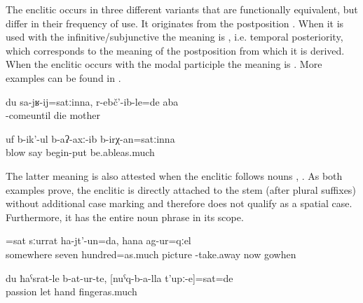 The enclitic  occurs in three different variants that are functionally equivalent, but differ in their frequency of use. It originates from the postposition  . When it is used with the infinitive/subjunctive the meaning is  , i.e. temporal posteriority, which corresponds to the meaning of the postposition from which it is derived. When the enclitic occurs with the modal participle the meaning is  . More examples can be found in .

\begin{exe}
	\ex	\label{ex:‎Until I came my mother died1}
	\gll	du	sa-jʁ-ij=satːinna,	r-ebč'-ib-le=de	aba\\
			-comeuntil	die	mother\\
	\glt	{}
	
		\ex	\label{ex:(The wind) began to blow as strong as it could}
	\gll	uf	b-ik'-ul	b-aʔ-axː-ib	b-irχ-an=satːinna\\
		blow	say	begin-put	be.ableas.much\\
	\glt	{}
\end{exe}


The latter meaning is also attested when the enclitic follows nouns , . As both examples prove, the enclitic is directly attached to the stem (after plural suffixes) without additional case marking and therefore does not qualify as a spatial case. Furthermore, it has the entire noun phrase in its scope.
%
\begin{exe}
	\ex	\label{ex:‎‎‎Around as much as 700 pictures I made when we went (there) now}
	=sat	sːurrat	ha-jt'-un=da,	hana	ag-ur=qːel\\
		somewhere	seven	hundred=as.much	picture	-take.away	now	gowhen\\
	\glt	{}

	\ex	\label{ex:‎‎‎The ones that I left in passion (i.e. that fell in love with me)}
	\gll	du	ħaˁsrat-le	b-at-ur-te,	[nuˁq-b-a-lla	t'upː-e]=sat=de\\
			passion	let hand	fingeras.much\\
	\glt	{}
\end{exe}

